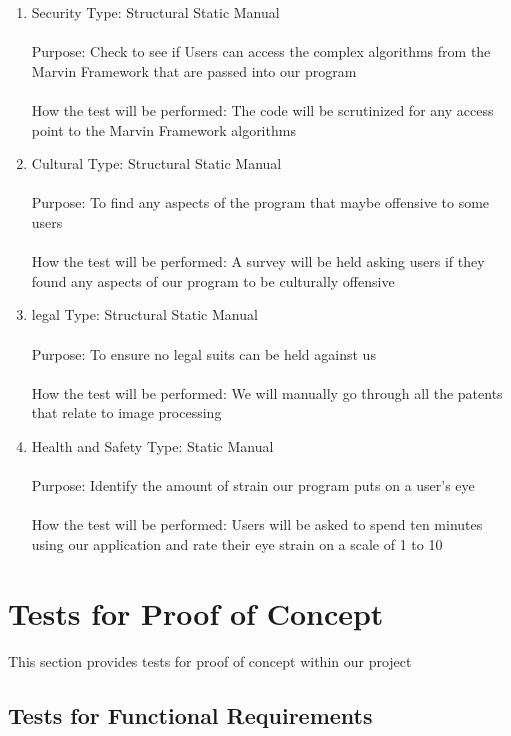 \documentclass[12pt, titlepage]{article}
\begin{document}
\begin{enumerate}
\item{Security}
Type: Structural Static Manual\\ \\
Purpose: Check to see if Users can access the complex algorithms from the Marvin Framework that are passed into our program\\ \\
How the test will be performed: The code will be scrutinized for any access point to the Marvin Framework algorithms

\item{Cultural}
Type: Structural Static Manual\\ \\
Purpose: To find any aspects of the program that maybe offensive to some users\\ \\
How the test will be performed: A survey will be held asking users if they found any aspects of our program to be culturally offensive

\item{legal}
Type: Structural Static Manual\\ \\
Purpose: To ensure no legal suits can be held against us \\ \\
How the test will be performed: We will manually go through all the patents that relate to image processing

\item{Health and Safety}
Type: Static Manual\\ \\
Purpose: Identify the amount of strain our program puts on a user’s eye\\ \\
How the test will be performed: Users will be asked to spend ten minutes using our application and rate their eye strain on a scale of 1 to 10
 

\end{enumerate}

\section{Tests for Proof of Concept}

This section provides tests for proof of concept within our project

\subsection{Tests for Functional Requirements}
		
\end{document}
